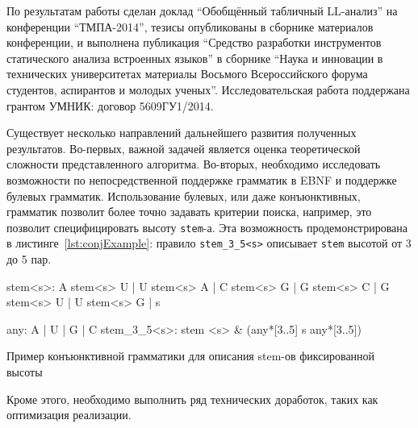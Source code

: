 \documentclass[14pt]{matmex-diploma}
\begin{document}
По результатам работы сделан доклад ``Обобщённый табличный LL-анализ'' на конференции ``ТМПА-2014'', тезисы опубликованы в сборнике материалов конференции,  и выполнена  публикация ``Средство разработки инструментов статического анализа встроенных языков'' в сборнике ``Наука и инновации в технических университетах материалы Восьмого Всероссийского форума студентов, аспирантов и молодых ученых''. Исследовательская работа поддержана грантом УМНИК: договор \textnumero 5609ГУ1/2014.

Существует несколько направлений дальнейшего развития полученных результатов. Во-первых, важной задачей является оценка теоретической сложности представленного алгоритма. Во-вторых, необходимо исследовать возможности по непосредственной поддержке грамматик в EBNF и поддержке булевых грамматик. Использование булевых, или даже конъюнктивных, грамматик позволит более точно задавать критерии поиска, например, это позволит специфицировать высоту \texttt{stem}-а. Эта возможность продемонстрирована в листинге~\ref{lst:conjExample}: правило \verb|stem_3_5<s>| описывает \texttt{stem} высотой от 3 до 5 пар.

\begin{listing}
    \begin{pyglist}[language=ocaml,numbers=left,numbersep=5pt]

stem<s>: 
      A stem<s> U
    | U stem<s> A
    | C stem<s> G
    | G stem<s> C
    | G stem<s> U
    | U stem<s> G
    | s

any: A | U | G | C
stem_3_5<s>: stem <s> & (any*[3..5] s any*[3..5])

\end{pyglist}
\caption{Пример конъюнктивной грамматики для описания stem-ов фиксированной высоты}
\label{lst:conjExample}
\end{listing}


Кроме этого, необходимо выполнить ряд технических доработок, таких как оптимизация реализации.

\setmonofont[Mapping=tex-text]{CMU Typewriter Text}


\end{document}
